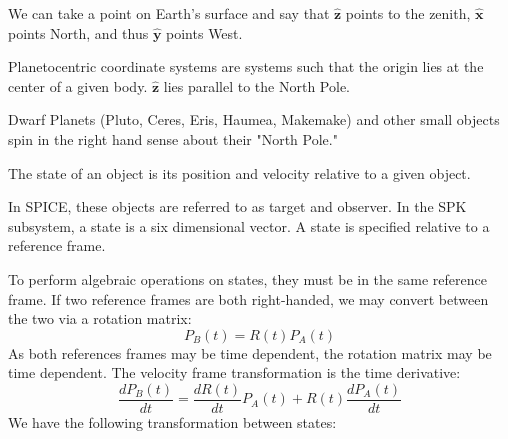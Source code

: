 \documentclass[crop=false,class=book]{standalone}
\begin{document}
            \begin{example}
            We can take a point on Earth's surface and say that $\hat{\mathbf{z}}$ points to the zenith, $\hat{\mathbf{x}}$ points North, and thus $\hat{\mathbf{y}}$ points West.
            \end{example}
            \begin{definition}
            Planetocentric coordinate systems are systems such that the origin lies at the center of a given body. $\hat{\mathbf{z}}$ lies parallel to the North Pole.
            \end{definition}
            \begin{remark}
            Dwarf Planets (Pluto, Ceres, Eris, Haumea, Makemake) and other small objects spin in the right hand sense about their "North Pole."
            \end{remark}
            \begin{definition}
            The state of an object is its position and velocity relative to a given object.
            \end{definition}
            \begin{remark}
            In SPICE, these objects are referred to as target and observer. In the SPK subsystem, a state is a six dimensional vector. A state is specified relative to a reference frame.
            \end{remark}
            To perform algebraic operations on states, they must be in the same reference frame. If two reference frames are both right-handed, we may convert between the two via a rotation matrix:
            \begin{equation}
            P_{B}(t)=R(t)P_{A}(t)
            \end{equation}
            As both references frames may be time dependent, the rotation matrix may be time dependent. The velocity frame transformation is the time derivative:
            \begin{equation}
            \frac{dP_{B}(t)}{dt}=\frac{dR(t)}{dt}P_{A}(t)+R(t)\frac{dP_{A}(t)}{dt}
            \end{equation}
            We have the following transformation between states:
\end{document}

